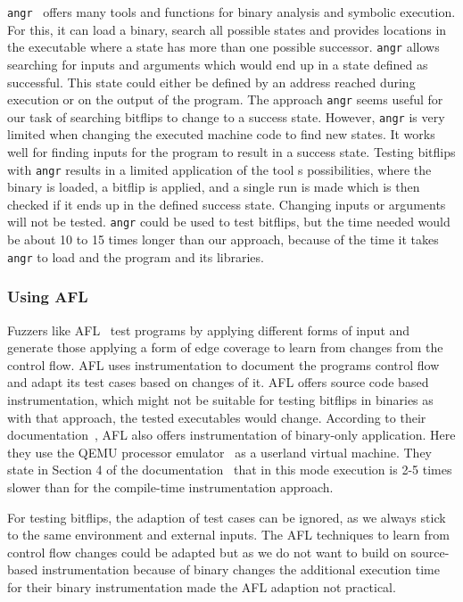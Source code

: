 \texttt{angr}~\cite{angrpaper} offers many tools and functions for binary
analysis and symbolic execution. For this, it can load a binary, search all
possible states and provides locations in the executable where a state has more
than one possible successor. \texttt{angr} allows searching for inputs and
arguments which would end up in a state defined as successful. This state could
either be defined by an address reached during execution or on the output of the
program. The approach \texttt{angr} seems useful for our task of searching
bitflips to change to a success state. However, \texttt{angr} is very limited
when changing the executed machine code to find new states. It works well for
finding inputs for the program to result in a success state. Testing bitflips
with \texttt{angr} results in a limited application of the tool\textquotesingle
s possibilities, where the binary is loaded, a bitflip is applied, and a single
run is made which is then checked if it ends up in the defined success state.
Changing inputs or arguments will not be tested. \texttt{angr} could be used to
test bitflips, but the time needed would be about \num{10} to \num{15} times
longer than our approach, because of the time it takes \texttt{angr} to load and
the program and its libraries.

\subsubsection{Using AFL}

Fuzzers like AFL~\cite{aflweb} test programs by applying different forms of
input and generate those applying a form of edge coverage to learn from changes
from the control flow. AFL uses instrumentation to document the
program\textquotesingle s control flow and adapt its test cases based on changes
of it. AFL offers source code based instrumentation, which might not be suitable
for testing bitflips in binaries as with that approach, the tested executables
would change. According to their documentation~\cite{aflreadme}, AFL also offers
instrumentation of binary-only application. Here they use the QEMU processor
emulator~\cite{qemuweb} as a userland virtual machine. They state in Section 4
of the documentation~\cite{aflreadme} that in this mode execution is 2-5 times
slower than for the compile-time instrumentation approach.

For testing bitflips, the adaption of test cases can be ignored, as we always
stick to the same environment and external inputs. The AFL techniques to learn
from control flow changes could be adapted but as we do not want to build on
source-based instrumentation because of binary changes the additional execution
time for their binary instrumentation made the AFL adaption not practical.

